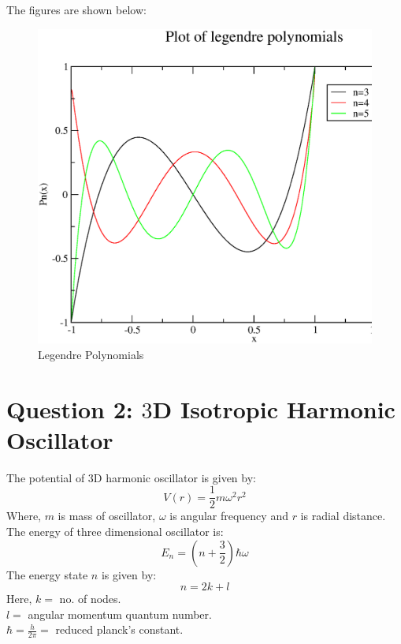 \documentclass[11pt,a4paper,english]{article}
\newcommand{\beq}{\begin{equation}}
\newcommand{\eeq}{\end{equation}}
\begin{document}
	    The figures are shown below:\\
	\begin{figure}[h!]
	\centering
	\includegraphics [scale=0.6]{figures/hw12qn1.eps}
	\caption{Legendre Polynomials }
	\end{figure}
	\clearpage
	
\clearpage	
\section{Question 2: $3$D Isotropic Harmonic Oscillator  }

	The potential of $3$D harmonic oscillator is given by:\\
	
	\beq
	V(r) = \frac{1}{2}m\omega^2r^2 	
	\eeq
	Where, $m$ is mass of oscillator, $\omega$ is angular frequency and $r$ is
	radial distance.
	The energy of three dimensional oscillator is:
	\beq 
	E_n = (n + \frac{3}{2}) \hbar\omega
	\eeq
	The energy state $n$ is given by:\\
	\beq 
	n = 2k + l
	\eeq 
	Here, $k =$ no. of nodes.\\
	$l=$  angular momentum quantum number.\\
	$\hbar = \frac{h}{2\pi} = $ reduced planck's constant.
	
\end{document}
